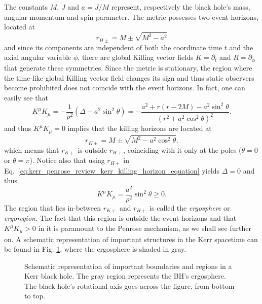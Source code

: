 The constants $M$, $J$ and $a = J/M$ represent, respectively the black hole's mass, angular momentum and spin parameter. The metric possesses two event horizons, located at
%
\begin{equation}
  r_{H\pm} = M \pm \sqrt{M^2 - a^2}
  \label{eq:kerr_penrose_review_kerr_horizons}
\end{equation}
%
and since its components are independent of both the coordinate time $t$ and the axial angular variable $\phi$, there are global Killing vector fields $K = \partial_t$ and $R = \partial_\phi$ that generate these symmetries. Since the metric is stationary, the region where the time-like global Killing vector field changes its sign and thus static observers become prohibited does not coincide with the event horizons. In fact, one can easily see that
%
\begin{equation}
  K^\mu K_\mu = -\frac{1}{\rho^2}\left({\Delta - a^2 \sin^2\theta}\right) = -\frac{a^2 + r(r-2M)-a^2\sin^2\theta}{(r^2+a^2\cos^2\theta)^2}.
  \label{eq:kerr_penrose_review_kerr_killing_horizon_equation}
\end{equation}
%
and thus $K^\mu K_\mu = 0$ implies that the killing horizons are located at
%
\begin{equation}
  r_{K\pm} = M \pm \sqrt{M^2 - a^2\cos^2\theta}.
  \label{eq:kerr_penrose_review_kerr_killing_horizon_solution}
\end{equation}
%
which means that $r_{K+}$ is outside $r_{H+}$, coinciding with it only at the poles ($\theta=0$ or $\theta=\pi$). Notice also that using $r_{H+}$ in Eq.~\eqref{eq:kerr_penrose_review_kerr_killing_horizon_equation} yields $\Delta=0$ and thus
%
\begin{equation}
  K^\mu K_\mu = \frac{a^2}{\rho^2}\sin^2\theta \geq 0.
  \label{eq:kerr_penrose_review_kerr_killing_horizon_solution_2}
\end{equation}
%
The region that lies in-between $r_{K+}$ and $r_{H+}$ is called the \emph{ergosphere} or \emph{ergoregion}. The fact that this region is outside the event horizons and that $K^\mu K_\mu>0$ in it is paramount to the Penrose mechanism, as we shall see further on. A schematic representation of important structures in the Kerr spacetime can be found in Fig. \ref{fig:kerr_penrose_review_kerr_surfaces}, where the ergosphere is shaded in gray.

\begin{figure}[!ht]
  \centering
  
  \caption{Schematic representation of important boundaries and regions in a Kerr black hole. The gray region represents the BH's ergosphere. The black hole's rotational axis goes across the figure, from bottom to top.}
  \label{fig:kerr_penrose_review_kerr_surfaces}
\end{figure}

